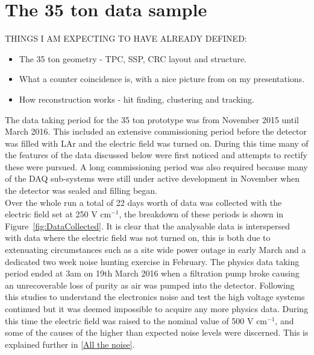 \chapter{The 35 ton data sample}  %

THINGS I AM EXPECTING TO HAVE ALREADY DEFINED:
\begin{itemize}
\item The 35 ton geometry - TPC, SSP, CRC layout and structure.
\item What a counter coincidence is, with a nice picture from on my presentations. 
\item How reconstruction works - hit finding, clustering and tracking.
\end{itemize}
  
\graphicspath{{35tonData/Figs/PDF/}{35tonData/Figs/Raster/}{35tonData/Figs/Vector/}}

The data taking period for the 35 ton prototype was from November 2015 until March 2016. This included an extensive commissioning period before the detector was filled with LAr and the electric field was turned on. During this time many of the features of the data discussed below were first noticed and attempts to rectify these were pursued. A long commissioning period was also required because many of the DAQ sub-systems were still under active development in November when the detector was sealed and filling began.\\

Over the whole run a total of 22 days worth of data was collected with the electric field set at 250 V cm$^{-1}$, the breakdown of these periods is shown in Figure~\ref{fig:DataCollected}. It is clear that the analysable data is interspersed with data where the electric field was not turned on, this is both due to extenuating circumstances such as a site wide power outage in early March and a dedicated two week noise hunting exercise in February. The physics data taking period ended at 3am on 19th March 2016 when a filtration pump broke causing an unrecoverable loss of purity as air was pumped into the detector. Following this studies to understand the electronics noise and test the high voltage systems continued but it was deemed impossible to acquire any more physics data. During this time the electric field was raised to the nominal value of 500  V cm$^{-1}$, and some of the causes of the higher than expected noise levels were discerned. This is explained further in \ref{All the noise}. 

